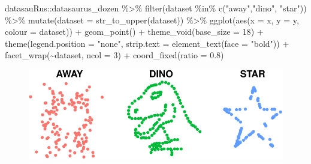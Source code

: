 \documentclass[
  letterpaper,
]{book}
\newenvironment{Shaded}{\begin{snugshade}}{\end{snugshade}}
\newcommand{\AttributeTok}[1]{\textcolor[rgb]{0.40,0.45,0.13}{#1}}
\newcommand{\DecValTok}[1]{\textcolor[rgb]{0.68,0.00,0.00}{#1}}
\newcommand{\FloatTok}[1]{\textcolor[rgb]{0.68,0.00,0.00}{#1}}
\newcommand{\FunctionTok}[1]{\textcolor[rgb]{0.28,0.35,0.67}{#1}}
\newcommand{\NormalTok}[1]{\textcolor[rgb]{0.00,0.23,0.31}{#1}}
\newcommand{\SpecialCharTok}[1]{\textcolor[rgb]{0.37,0.37,0.37}{#1}}
\newcommand{\StringTok}[1]{\textcolor[rgb]{0.13,0.47,0.30}{#1}}
\begin{document}
\begin{Shaded}
\begin{Highlighting}[]
\NormalTok{datasauRus}\SpecialCharTok{::}\NormalTok{datasaurus\_dozen }\SpecialCharTok{\%\textgreater{}\%} \FunctionTok{filter}\NormalTok{(dataset }\SpecialCharTok{\%in\%} \FunctionTok{c}\NormalTok{(}\StringTok{"away"}\NormalTok{,}\StringTok{"dino"}\NormalTok{, }\StringTok{"star"}\NormalTok{)) }\SpecialCharTok{\%\textgreater{}\%}
\FunctionTok{mutate}\NormalTok{(}\AttributeTok{dataset =} \FunctionTok{str\_to\_upper}\NormalTok{(dataset)) }\SpecialCharTok{\%\textgreater{}\%}
\FunctionTok{ggplot}\NormalTok{(}\FunctionTok{aes}\NormalTok{(}\AttributeTok{x =}\NormalTok{ x, }\AttributeTok{y =}\NormalTok{ y, }\AttributeTok{colour =}\NormalTok{ dataset)) }\SpecialCharTok{+}
  \FunctionTok{geom\_point}\NormalTok{() }\SpecialCharTok{+}
  \FunctionTok{theme\_void}\NormalTok{(}\AttributeTok{base\_size =} \DecValTok{18}\NormalTok{) }\SpecialCharTok{+}
  \FunctionTok{theme}\NormalTok{(}\AttributeTok{legend.position =} \StringTok{"none"}\NormalTok{,  }
        \AttributeTok{strip.text =} \FunctionTok{element\_text}\NormalTok{(}\AttributeTok{face =} \StringTok{"bold"}\NormalTok{)) }\SpecialCharTok{+}
  \FunctionTok{facet\_wrap}\NormalTok{(}\SpecialCharTok{\textasciitilde{}}\NormalTok{dataset, }\AttributeTok{ncol =} \DecValTok{3}\NormalTok{) }\SpecialCharTok{+}
  \FunctionTok{coord\_fixed}\NormalTok{(}\AttributeTok{ratio =} \FloatTok{0.8}\NormalTok{)}
\end{Highlighting}
\end{Shaded}

\begin{figure}[H]

{\centering \includegraphics{./data_viz_files/figure-pdf/unnamed-chunk-3-1.pdf}

}

\end{figure}
\end{document}
